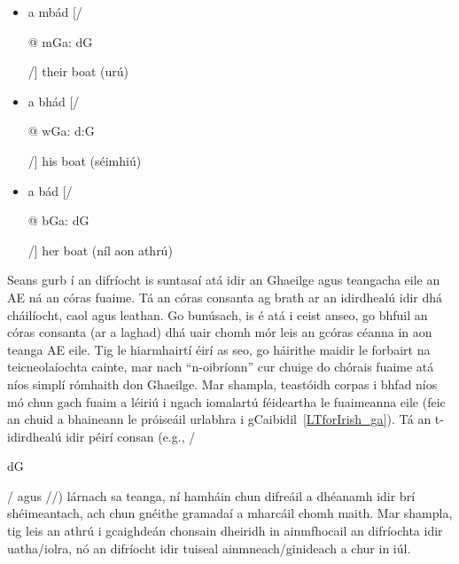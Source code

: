 \begin{multicols}{2}
\begin{itemize}
\item a mbád [/\begin{IPA}@ m\super Ga: d\super G\end{IPA}/] their boat (urú)
\item a bhád [/\begin{IPA}@ w\super Ga: d:G\end{IPA}/] his boat (séimhiú)
\item a bád [/\begin{IPA}@ b\super Ga: d\super G\end{IPA}/] her boat (níl aon athrú)
\end{itemize}

Seans gurb í an difríocht is suntasaí atá idir an Ghaeilge agus teangacha eile an AE ná an córas fuaime. Tá an córas consanta ag brath ar an idirdhealú idir dhá cháilíocht, caol agus leathan. Go bunúsach, is é atá i ceist anseo, go bhfuil an córas consanta (ar a laghad) dhá uair chomh mór leis an gcóras céanna in aon teanga AE eile.  Tig le hiarmhairtí éirí as seo, go háirithe maidir le forbairt na teicneolaíochta cainte, mar nach “n-oibríonn” cur chuige do chórais fuaime atá níos simplí rómhaith don Ghaeilge. Mar shampla, teastóidh corpas i bhfad níos mó chun gach fuaim a léiriú i ngach iomalartú féideartha le fuaimeanna eile (feic an chuid a bhaineann le próiseáil urlabhra i gCaibidil~\ref{LTforIrish_ga}). Tá an t-idirdhealú idir péirí consan (e.g., /\begin{IPA}d\super G\end{IPA}/ agus //) lárnach sa teanga, ní hamháin chun difreáil a dhéanamh idir brí shéimeantach, ach chun gnéithe gramadaí a mharcáil chomh maith. Mar shampla, tig leis an athrú i gcaighdeán chonsain dheiridh in ainmfhocail an difríochta idir uatha/iolra, nó an difríocht idir tuiseal ainmneach/ginideach a chur in iúl.



\end{multicols}
